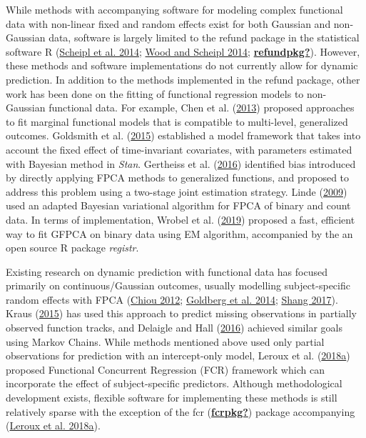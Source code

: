 \documentclass[
  11pt,
]{article}
\begin{document}
While methods with accompanying software for modeling complex functional
data with non-linear fixed and random effects exist for both Gaussian
and non-Gaussian data, software is largely limited to the refund package
in the statistical software R
(\protect\hyperlink{ref-Scheipl2014}{Scheipl et al. 2014};
\protect\hyperlink{ref-wood2014}{Wood and Scheipl 2014};
\protect\hyperlink{ref-refundpkg}{\textbf{refundpkg?}}). However, these
methods and software implementations do not currently allow for dynamic
prediction. In addition to the methods implemented in the refund
package, other work has been done on the fitting of functional
regression models to non-Gaussian functional data. For example, Chen et
al. (\protect\hyperlink{ref-chen2013}{2013}) proposed approaches to fit
marginal functional models that is compatible to multi-level,
generalized outcomes. Goldsmith et al.
(\protect\hyperlink{ref-goldsmith2015}{2015}) established a model
framework that takes into account the fixed effect of time-invariant
covariates, with parameters estimated with Bayesian method in
\emph{Stan}. Gertheiss et al.
(\protect\hyperlink{ref-gertheiss2016}{2016}) identified bias introduced
by directly applying FPCA methods to generalized functions, and proposed
to address this problem using a two-stage joint estimation strategy.
Linde (\protect\hyperlink{ref-linde2019}{2009}) used an adapted Bayesian
variational algorithm for FPCA of binary and count data. In terms of
implementation, Wrobel et al. (\protect\hyperlink{ref-wrobel2019}{2019})
proposed a fast, efficient way to fit GFPCA on binary data using EM
algorithm, accompanied by the an open source R package \emph{registr}.

Existing research on dynamic prediction with functional data has focused
primarily on continuous/Gaussian outcomes, usually modelling
subject-specific random effects with FPCA
(\protect\hyperlink{ref-chiou2012}{Chiou 2012};
\protect\hyperlink{ref-goldberg2014}{Goldberg et al. 2014};
\protect\hyperlink{ref-shang2017}{Shang 2017}). Kraus
(\protect\hyperlink{ref-kraus2015}{2015}) has used this approach to
predict missing observations in partially observed function tracks, and
Delaigle and Hall (\protect\hyperlink{ref-delaigo2016}{2016}) achieved
similar goals using Markov Chains. While methods mentioned above used
only partial observations for prediction with an intercept-only model,
Leroux et al. (\protect\hyperlink{ref-leroux2016}{2018a}) proposed
Functional Concurrent Regression (FCR) framework which can incorporate
the effect of subject-specific predictors. Although methodological
development exists, flexible software for implementing these methods is
still relatively sparse with the exception of the fcr
(\protect\hyperlink{ref-fcrpkg}{\textbf{fcrpkg?}}) package accompanying
(\protect\hyperlink{ref-leroux2016}{Leroux et al. 2018a}).
\end{document}
